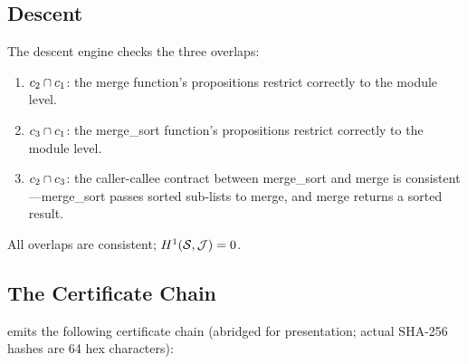 \documentclass[11pt]{article}
\begin{document}
\subsection{Descent}

The descent engine checks the three overlaps:
\begin{enumerate}
  \item $c_2 \cap c_1$: the merge function's propositions
    restrict correctly to the module level.
  \item $c_3 \cap c_1$: the merge\_sort function's propositions
    restrict correctly to the module level.
  \item $c_2 \cap c_3$: the caller-callee contract between
    merge\_sort and merge is consistent---merge\_sort passes sorted
    sub-lists to merge, and merge returns a sorted result.
\end{enumerate}
All overlaps are consistent; $H^{1}(\mathcal{S}, \mathcal{J}) = 0$.

\subsection{The Certificate Chain}

\JuGeo{} emits the following certificate chain (abridged for
presentation; actual SHA-256 hashes are 64 hex characters):
\end{document}
